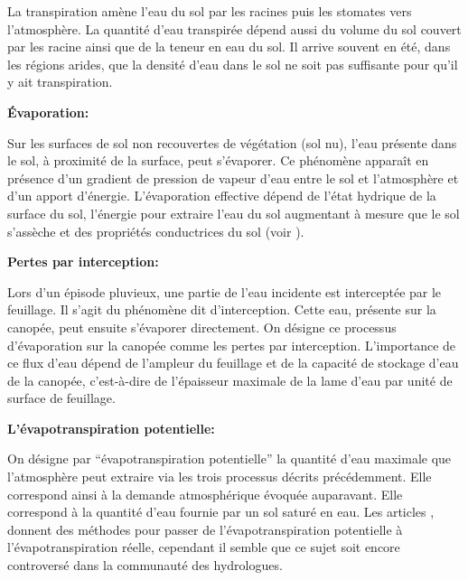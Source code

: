 \documentclass[a4paper,11pt]{article}
\numberwithin{equation}{section}
\begin{document}
La transpiration amène l'eau du sol par les racines puis les stomates vers l'atmosphère. La quantité d'eau transpirée dépend aussi du volume du sol couvert par les racine ainsi que de la teneur en eau du sol. Il arrive souvent en été, dans les régions arides, que la densité d'eau dans le sol ne soit pas suffisante pour qu'il y ait transpiration.

\vspace{0.7cm}

\noindent\textbf{Évaporation:}

Sur les surfaces de sol non recouvertes de végétation (sol nu), l’eau présente dans le sol, à proximité de la surface, peut s’évaporer. Ce phénomène apparaît en présence d’un gradient de pression de vapeur d’eau entre le sol et l’atmosphère et d’un apport d’énergie. L’évaporation effective dépend de l’état hydrique de la surface du sol, l’énergie pour extraire l’eau du sol augmentant à mesure que le sol s’assèche et des propriétés conductrices du sol (voir \cite{hillel2003introduction}).

\vspace{1.1cm}

\noindent\textbf{Pertes par interception:}

Lors d’un épisode pluvieux, une partie de l’eau incidente est interceptée par le feuillage. Il s’agit du phénomène dit d’interception. Cette eau, présente sur la canopée, peut ensuite s’évaporer directement. On désigne ce processus d’évaporation sur la canopée comme les pertes par interception. L’importance de ce flux d’eau dépend de l’ampleur du feuillage et de la capacité de stockage d’eau de la canopée, c’est-à-dire de l’épaisseur maximale de la lame d’eau par unité de surface de feuillage.

\vspace{0.7cm}

\noindent\textbf{L'évapotranspiration potentielle:}

On désigne par  ``évapotranspiration potentielle'' la quantité d’eau maximale que l’atmosphère peut extraire via les trois processus décrits précédemment. Elle correspond ainsi à la demande atmosphérique évoquée auparavant. Elle correspond à la quantité d'eau fournie par un sol saturé en eau. Les articles \cite{kristensen1975model}, \cite{zhifang2010estimation} donnent des méthodes pour passer de l'évapotranspiration potentielle à l'évapotranspiration réelle, cependant il semble que ce sujet soit encore controversé dans la communauté des hydrologues.  
\end{document}
